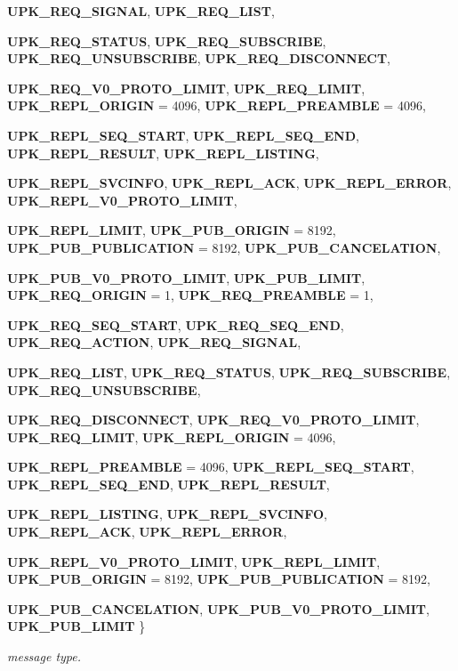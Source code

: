 \begin{DoxyCompactItemize}
{\bf UPK\_\-REQ\_\-SIGNAL}, 
{\bf UPK\_\-REQ\_\-LIST}, 
\par
{\bf UPK\_\-REQ\_\-STATUS}, 
{\bf UPK\_\-REQ\_\-SUBSCRIBE}, 
{\bf UPK\_\-REQ\_\-UNSUBSCRIBE}, 
{\bf UPK\_\-REQ\_\-DISCONNECT}, 
\par
{\bf UPK\_\-REQ\_\-V0\_\-PROTO\_\-LIMIT}, 
{\bf UPK\_\-REQ\_\-LIMIT}, 
{\bf UPK\_\-REPL\_\-ORIGIN} =  4096, 
{\bf UPK\_\-REPL\_\-PREAMBLE} =  4096, 
\par
{\bf UPK\_\-REPL\_\-SEQ\_\-START}, 
{\bf UPK\_\-REPL\_\-SEQ\_\-END}, 
{\bf UPK\_\-REPL\_\-RESULT}, 
{\bf UPK\_\-REPL\_\-LISTING}, 
\par
{\bf UPK\_\-REPL\_\-SVCINFO}, 
{\bf UPK\_\-REPL\_\-ACK}, 
{\bf UPK\_\-REPL\_\-ERROR}, 
{\bf UPK\_\-REPL\_\-V0\_\-PROTO\_\-LIMIT}, 
\par
{\bf UPK\_\-REPL\_\-LIMIT}, 
{\bf UPK\_\-PUB\_\-ORIGIN} =  8192, 
{\bf UPK\_\-PUB\_\-PUBLICATION} =  8192, 
{\bf UPK\_\-PUB\_\-CANCELATION}, 
\par
{\bf UPK\_\-PUB\_\-V0\_\-PROTO\_\-LIMIT}, 
{\bf UPK\_\-PUB\_\-LIMIT}, 
{\bf UPK\_\-REQ\_\-ORIGIN} =  1, 
{\bf UPK\_\-REQ\_\-PREAMBLE} =  1, 
\par
{\bf UPK\_\-REQ\_\-SEQ\_\-START}, 
{\bf UPK\_\-REQ\_\-SEQ\_\-END}, 
{\bf UPK\_\-REQ\_\-ACTION}, 
{\bf UPK\_\-REQ\_\-SIGNAL}, 
\par
{\bf UPK\_\-REQ\_\-LIST}, 
{\bf UPK\_\-REQ\_\-STATUS}, 
{\bf UPK\_\-REQ\_\-SUBSCRIBE}, 
{\bf UPK\_\-REQ\_\-UNSUBSCRIBE}, 
\par
{\bf UPK\_\-REQ\_\-DISCONNECT}, 
{\bf UPK\_\-REQ\_\-V0\_\-PROTO\_\-LIMIT}, 
{\bf UPK\_\-REQ\_\-LIMIT}, 
{\bf UPK\_\-REPL\_\-ORIGIN} =  4096, 
\par
{\bf UPK\_\-REPL\_\-PREAMBLE} =  4096, 
{\bf UPK\_\-REPL\_\-SEQ\_\-START}, 
{\bf UPK\_\-REPL\_\-SEQ\_\-END}, 
{\bf UPK\_\-REPL\_\-RESULT}, 
\par
{\bf UPK\_\-REPL\_\-LISTING}, 
{\bf UPK\_\-REPL\_\-SVCINFO}, 
{\bf UPK\_\-REPL\_\-ACK}, 
{\bf UPK\_\-REPL\_\-ERROR}, 
\par
{\bf UPK\_\-REPL\_\-V0\_\-PROTO\_\-LIMIT}, 
{\bf UPK\_\-REPL\_\-LIMIT}, 
{\bf UPK\_\-PUB\_\-ORIGIN} =  8192, 
{\bf UPK\_\-PUB\_\-PUBLICATION} =  8192, 
\par
{\bf UPK\_\-PUB\_\-CANCELATION}, 
{\bf UPK\_\-PUB\_\-V0\_\-PROTO\_\-LIMIT}, 
{\bf UPK\_\-PUB\_\-LIMIT}
 \}
\begin{DoxyCompactList}\small\item\em message type. \end{DoxyCompactList}\end{DoxyCompactItemize}
